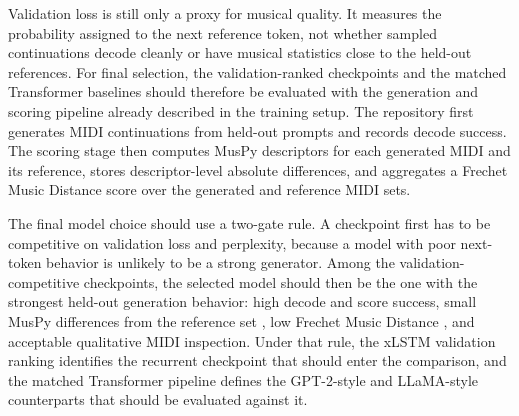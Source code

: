 Validation loss is still only a proxy for musical quality. It measures the probability assigned to the next reference token, not whether sampled continuations decode cleanly or have musical statistics close to the held-out references. For final selection, the validation-ranked checkpoints and the matched Transformer baselines should therefore be evaluated with the generation and scoring pipeline already described in the training setup. The repository first generates MIDI continuations from held-out prompts and records decode success. The scoring stage then computes MusPy descriptors \citep{dongMusPyToolkitSymbolic2020} for each generated MIDI and its reference, stores descriptor-level absolute differences, and aggregates a Frechet Music Distance score \citep{retkowskiFrechetMusicDistance2025} over the generated and reference MIDI sets.

The final model choice should use a two-gate rule. A checkpoint first has to be competitive on validation loss and perplexity, because a model with poor next-token behavior is unlikely to be a strong generator. Among the validation-competitive checkpoints, the selected model should then be the one with the strongest held-out generation behavior: high decode and score success, small MusPy differences from the reference set \citep{dongMusPyToolkitSymbolic2020}, low Frechet Music Distance \citep{retkowskiFrechetMusicDistance2025}, and acceptable qualitative MIDI inspection. Under that rule, the xLSTM validation ranking identifies the recurrent checkpoint that should enter the comparison, and the matched Transformer pipeline defines the GPT-2-style and LLaMA-style counterparts that should be evaluated against it.
